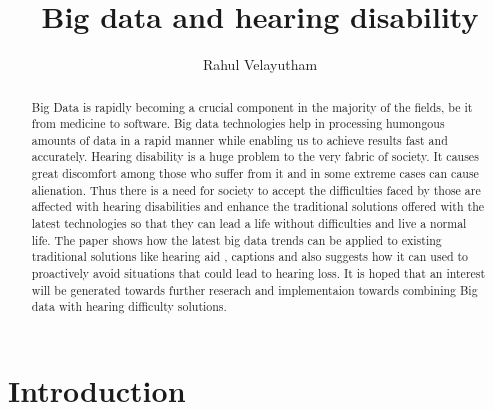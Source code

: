 \documentclass[sigconf]{acmart}
\begin{document}
\title{Big data and hearing disability}


\author{Rahul Velayutham}

\renewcommand{\shortauthors}{R. Velayutham}


\begin{abstract}
Big Data is rapidly becoming a crucial component in the majority of the fields, be it from medicine to software. Big data technologies help in processing humongous amounts of data in a rapid manner while enabling us to achieve results fast and accurately. Hearing disability is a huge problem to the very fabric of society. It causes great discomfort among those who suffer from it and in some extreme cases can cause alienation. Thus there is a need for society to accept the difficulties faced by those are affected with hearing disabilities and enhance the traditional solutions offered with the latest technologies so that they can lead a life without difficulties and live a normal life. The paper shows how the latest big data trends can be applied to existing traditional solutions like hearing aid , captions and also suggests how it can used to proactively avoid situations that could lead to hearing loss. It is hoped that an interest will be generated towards further reserach and implementaion towards combining Big data with hearing difficulty solutions.
\end{abstract}



\maketitle



\section{Introduction}
\end{document}
